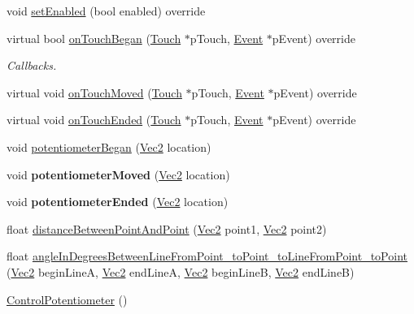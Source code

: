 \begin{DoxyCompactItemize}
\item 
void \hyperlink{classControlPotentiometer_ac67b583a3a21f6c44ffcf57b41c33278}{set\+Enabled} (bool enabled) override
\item 
virtual bool \hyperlink{classControlPotentiometer_ae5ab22036e6a15b6a5d388db38f29bc7}{on\+Touch\+Began} (\hyperlink{classTouch}{Touch} $\ast$p\+Touch, \hyperlink{classEvent}{Event} $\ast$p\+Event) override
\begin{DoxyCompactList}\small\item\em Callbacks. \end{DoxyCompactList}\item 
virtual void \hyperlink{classControlPotentiometer_aedfddc1d724a15c31897a50eaf1b93e6}{on\+Touch\+Moved} (\hyperlink{classTouch}{Touch} $\ast$p\+Touch, \hyperlink{classEvent}{Event} $\ast$p\+Event) override
\item 
virtual void \hyperlink{classControlPotentiometer_adfd4029e5b390ba94a0ba0373adbc5d9}{on\+Touch\+Ended} (\hyperlink{classTouch}{Touch} $\ast$p\+Touch, \hyperlink{classEvent}{Event} $\ast$p\+Event) override
\item 
void \hyperlink{classControlPotentiometer_a69e8c5d377472fd170890ae3690bb4de}{potentiometer\+Began} (\hyperlink{classVec2}{Vec2} location)
\item 
\mbox{\label{classControlPotentiometer_af9c282205e211f1ba0447158bfbf151e}} 
void {\bfseries potentiometer\+Moved} (\hyperlink{classVec2}{Vec2} location)
\item 
\mbox{\label{classControlPotentiometer_aac5c40fe78e249e162d17e19fdf974ef}} 
void {\bfseries potentiometer\+Ended} (\hyperlink{classVec2}{Vec2} location)
\item 
float \hyperlink{classControlPotentiometer_a4169e6c12a675aafd77d576acdaa837d}{distance\+Between\+Point\+And\+Point} (\hyperlink{classVec2}{Vec2} point1, \hyperlink{classVec2}{Vec2} point2)
\item 
float \hyperlink{classControlPotentiometer_a9662b2e1f7dcd8eca588a202bcf4709e}{angle\+In\+Degrees\+Between\+Line\+From\+Point\+\_\+to\+Point\+\_\+to\+Line\+From\+Point\+\_\+to\+Point} (\hyperlink{classVec2}{Vec2} begin\+LineA, \hyperlink{classVec2}{Vec2} end\+LineA, \hyperlink{classVec2}{Vec2} begin\+LineB, \hyperlink{classVec2}{Vec2} end\+LineB)
\item 
\hyperlink{classControlPotentiometer_a11449c0b00b26be771dc7850d0091ff0}{Control\+Potentiometer} ()

\end{DoxyCompactItemize}

